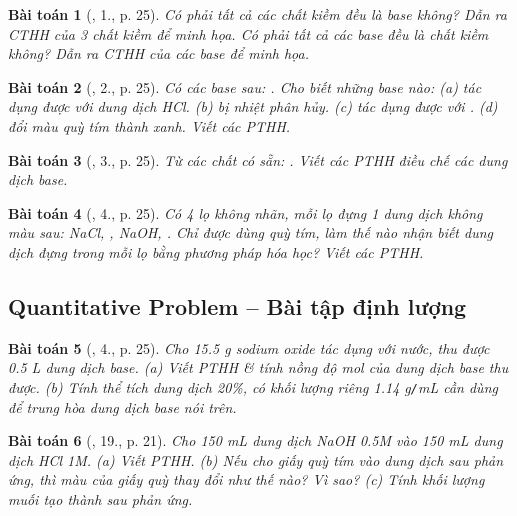 \documentclass{article}
\newtheorem{baitoan}{Bài toán}
\begin{document}
\begin{baitoan}[\cite{SGK_Hoa_Hoc_9}, 1., p. 25]
	Có phải tất cả các chất kiềm đều là base không? Dẫn ra CTHH của 3 chất kiềm để minh họa. Có phải tất cả các base đều là chất kiềm không? Dẫn ra CTHH của các base để minh họa.
\end{baitoan}

\begin{baitoan}[\cite{SGK_Hoa_Hoc_9}, 2., p. 25]
	Có các base sau: \emph{}. Cho biết những base nào: (a) tác dụng được với dung dịch \emph{HCl}. (b) bị nhiệt phân hủy. (c) tác dụng được với \emph{}. (d) đổi màu quỳ tím thành xanh. Viết các PTHH.
\end{baitoan}

\begin{baitoan}[\cite{SGK_Hoa_Hoc_9}, 3., p. 25]
	Từ các chất có sẵn: \emph{}. Viết các PTHH điều chế các dung dịch base.
\end{baitoan}

\begin{baitoan}[\cite{SGK_Hoa_Hoc_9}, 4., p. 25]
	Có 4 lọ không nhãn, mỗi lọ đựng 1 dung dịch không màu sau: \emph{NaCl, , NaOH, }. Chỉ được dùng quỳ tím, làm thế nào nhận biết dung dịch đựng trong mỗi lọ bằng phương pháp hóa học? Viết các PTHH.
\end{baitoan}

\subsection{Quantitative Problem -- Bài tập định lượng}

\begin{baitoan}[\cite{SGK_Hoa_Hoc_9}, 4., p. 25]
	Cho \emph{15.5 g} sodium oxide \emph{} tác dụng với nước, thu được \emph{0.5 L} dung dịch base. (a) Viết PTHH \& tính nồng độ mol của dung dịch base thu được. (b) Tính thể tích dung dịch \emph{ 20\%}, có khối lượng riêng \emph{1.14 g\texttt{/}mL} cần dùng để trung hòa dung dịch base nói trên.
\end{baitoan}

\begin{baitoan}[\cite{An_350_BT_Hoa_Hoc_9}, 19., p. 21]
	Cho \emph{150 mL} dung dịch \emph{NaOH 0.5M} vào \emph{150 mL} dung dịch \emph{HCl 1M}. (a) Viết PTHH. (b) Nếu cho giấy quỳ tím vào dung dịch sau phản ứng, thì màu của giấy quỳ thay đổi như thế nào? Vì sao? (c) Tính khối lượng muối tạo thành sau phản ứng.
\end{baitoan}
\end{document}
